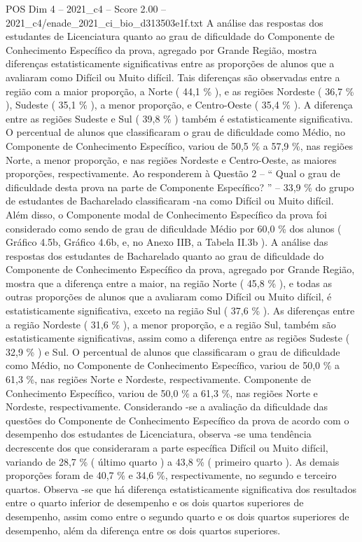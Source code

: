 \begin{textsample}{POS Dim 4 – 2021\_c4 – Score 2.00 – 2021\_c4/enade\_2021\_ci\_bio\_d313503e1f.txt}
A análise das respostas dos estudantes de Licenciatura quanto ao grau de dificuldade do Componente de Conhecimento Específico da prova, agregado por Grande Região, mostra diferenças estatisticamente significativas entre as proporções de alunos que a avaliaram como Difícil ou Muito difícil.
Tais diferenças são observadas entre a região com a maior proporção, a Norte ( 44,1 \% ), e as regiões Nordeste ( 36,7 \% ), Sudeste ( 35,1 \% ), a menor proporção, e Centro-Oeste ( 35,4 \% ).
A diferença entre as regiões Sudeste e Sul ( 39,8 \% ) também é estatisticamente significativa.
O percentual de alunos que classificaram o grau de dificuldade como Médio, no Componente de Conhecimento Específico, variou de 50,5 \% a 57,9 \%, nas regiões Norte, a menor proporção, e nas regiões Nordeste e Centro-Oeste, as maiores proporções, respectivamente.
Ao responderem à Questão 2 – “ Qual o grau de dificuldade desta prova na parte de Componente Específico? ” – 33,9 \% do grupo de estudantes de Bacharelado classificaram -na como Difícil ou Muito difícil.
Além disso, o Componente modal de Conhecimento Específico da prova foi considerado como sendo de grau de dificuldade Médio por 60,0 \% dos alunos ( Gráfico 4.5b, Gráfico 4.6b, e, no Anexo IIB, a Tabela II.3b ).
A análise das respostas dos estudantes de Bacharelado quanto ao grau de dificuldade do Componente de Conhecimento Específico da prova, agregado por Grande Região, mostra que a diferença entre a maior, na região Norte ( 45,8 \% ), e todas as outras proporções de alunos que a avaliaram como Difícil ou Muito difícil, é estatisticamente significativa, exceto na região Sul ( 37,6 \% ).
As diferenças entre a região Nordeste ( 31,6 \% ), a menor proporção, e a região Sul, também são estatisticamente significativas, assim como a diferença entre as regiões Sudeste ( 32,9 \% ) e Sul.
O percentual de alunos que classificaram o grau de dificuldade como Médio, no Componente de Conhecimento Específico, variou de 50,0 \% a 61,3 \%, nas regiões Norte e Nordeste, respectivamente.
Componente de Conhecimento Específico, variou de 50,0 \% a 61,3 \%, nas regiões Norte e Nordeste, respectivamente.
Considerando -se a avaliação da dificuldade das questões do Componente de Conhecimento Específico da prova de acordo com o desempenho dos estudantes de Licenciatura, observa -se uma tendência decrescente dos que consideraram a parte específica Difícil ou Muito difícil, variando de 28,7 \% ( último quarto ) a 43,8 \% ( primeiro quarto ).
As demais proporções foram de 40,7 \% e 34,6 \%, respectivamente, no segundo e terceiro quartos.
Observa -se que há diferença estatisticamente significativa dos resultados entre o quarto inferior de desempenho e os dois quartos superiores de desempenho, assim como entre o segundo quarto e os dois quartos superiores de desempenho, além da diferença entre os dois quartos superiores.

\end{textsample}
